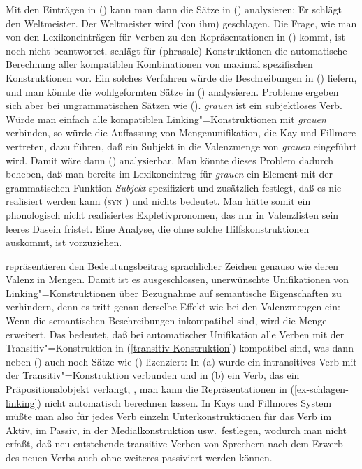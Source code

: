 \zl
Mit den Einträgen in () kann man dann die Sätze in () analysieren:
\eal
\ex Er schlägt den Weltmeister.
\ex Der Weltmeister wird (von ihm) geschlagen.
\zl
Die Frage, wie man von den Lexikoneinträgen für Verben zu den Repräsentationen in ()
kommt, ist noch nicht beantwortet. \citet{Kay2002a} schlägt für (phrasale) Konstruktionen
die automatische Berechnung aller kompatiblen Kombinationen von maximal spezifischen
Konstruktionen vor. Ein solches Verfahren würde die Beschreibungen in () liefern,
und man könnte die wohlgeformten Sätze in () analysieren.
Probleme ergeben sich aber bei ungrammatischen Sätzen wie (). \emph{grauen} ist ein
subjektloses Verb. Würde man einfach alle kompatiblen Linking"=Konstruktionen mit \emph{grauen}
verbinden, so würde die Auffassung von Mengenunifikation, die Kay und Fillmore vertreten, dazu führen,
daß ein Subjekt in die Valenzmenge von \emph{grauen} eingeführt wird. Damit wäre dann ()
analysierbar.
\z
Man könnte dieses Problem dadurch beheben, daß man bereits im Lexikoneintrag für \emph{grauen}
ein Element mit der grammatischen Funktion \emph{Subjekt} spezifiziert und zusätzlich festlegt,
daß es nie realisiert werden kann (\textsc{syn} ) und nichts bedeutet. Man hätte somit
ein phonologisch nicht realisiertes Expletivpronomen, das nur in Valenzlisten sein leeres Dasein
fristet. Eine Analyse, die ohne solche Hilfskonstruktionen auskommt, ist vorzuziehen.

\citet{KF99a} repräsentieren den Bedeutungsbeitrag sprachlicher Zeichen genauso wie deren Valenz in Mengen.
Damit ist es ausgeschlossen, unerwünschte Unifikationen von Linking"=Konstruktionen über Bezugnahme
auf semantische Eigenschaften zu verhindern, denn es tritt genau derselbe Effekt wie bei den
Valenzmengen ein: Wenn die semantischen Beschreibungen inkompatibel sind, wird die Menge erweitert. Das bedeutet, daß bei
automatischer Unifikation alle Verben mit der Transitiv"=Konstruktion in (\ref{transitiv-Konstruktion}) kompatibel sind,
was dann neben () auch noch Sätze wie () lizenziert:
\eal
{}
\zl
In (a) wurde ein intransitives Verb mit der Transitiv"=Konstruktion verbunden und in
(b) ein Verb, das ein Präpositionalobjekt verlangt, \dash, man kann die Repräsentationen in
(\ref{ex-schlagen-linking}) nicht automatisch berechnen lassen. In Kays und Fillmores System müßte
man also für jedes Verb einzeln Unterkonstruktionen für das Verb im Aktiv, im Passiv, in der
Medialkonstruktion usw.\ festlegen, wodurch man nicht erfaßt, daß neu entstehende transitive Verben
von Sprechern nach dem Erwerb des neuen Verbs auch ohne weiteres passiviert werden können.%
%

